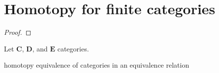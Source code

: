 \chapter{Homotopy for finite categories}

\begin{definition}
    
\end{definition}

\begin{definition}[Homotopy]
    
\end{definition}

\begin{theorem}
    
\end{theorem}

\begin{proof}
    
\end{proof}

\begin{definition}
    
\end{definition}

\begin{lemma}
    Let \(\mathbf{C}\), \(\mathbf{D}\), and \(\mathbf{E} \) categories.
\end{lemma}


\begin{definition}
    
\end{definition}

\begin{theorem}
    homotopy equivalence of categories in an equivalence relation
\end{theorem}


